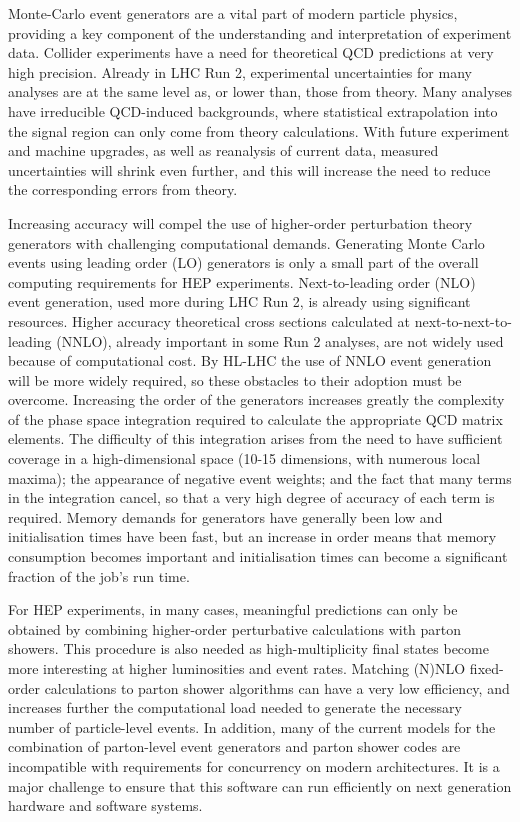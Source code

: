\documentclass[twocolumn]{svjour3}          %
\begin{document}
Monte-Carlo event generators are a vital part of modern particle
physics, providing a key component of the understanding and
interpretation of experiment data. Collider experiments have a need for
theoretical QCD predictions at very high precision. Already in LHC Run
2, experimental uncertainties for many analyses are at the same level as,
or lower than, those from theory. Many analyses have irreducible
QCD-induced backgrounds, where statistical extrapolation into the signal
region can only come from theory calculations. With future experiment
and machine upgrades, as well as reanalysis of current data, measured
uncertainties will shrink even further, and this will increase the need
to reduce the corresponding errors from theory.

Increasing accuracy will compel the use of higher-order perturbation
theory generators with challenging computational demands. Generating
Monte Carlo events using leading order (LO) generators is only a small
part of the overall computing requirements for HEP experiments.
Next-to-leading order (NLO) event generation, used more during LHC Run
2, is already using significant resources. Higher accuracy
theoretical cross sections calculated at next-to-next-to-leading (NNLO),
already important in some Run 2 analyses, are not widely used
because of computational cost. By HL-LHC the use of NNLO event
generation will be more widely required, so these obstacles to their
adoption must be overcome.
Increasing the order of the generators increases greatly the complexity
of the phase space integration required to calculate the appropriate QCD
matrix elements. The difficulty of this integration arises from the need
to have sufficient coverage in a high-dimensional space (10-15
dimensions, with numerous local maxima); the appearance of negative event
weights; and the fact that many terms in the integration cancel, so that
a very high degree of accuracy of each term is required. Memory demands
for generators have generally been low and initialisation times have
been fast, but an increase in order means that memory consumption
becomes important and initialisation times can become a significant 
fraction of the job's run time.

For HEP experiments, in many cases, meaningful predictions can only be
obtained by combining higher-order perturbative calculations with parton
showers. This procedure is also needed as high-multiplicity final states
become more interesting at higher luminosities and event rates. Matching
(N)NLO fixed-order calculations to parton shower algorithms can have a
very low efficiency, and increases further the computational load needed
to generate the necessary number of particle-level events. In addition,
many of the current models for the combination of parton-level event
generators and parton shower codes are incompatible with requirements
for concurrency on modern architectures. It is a major challenge to
ensure that this software can run efficiently on next generation
hardware and software systems.
\end{document}
